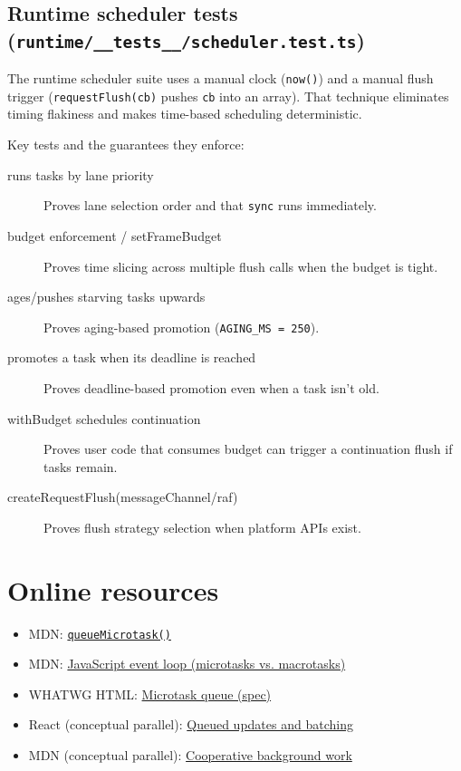 \subsection{Runtime scheduler tests (\texttt{runtime/\_\_tests\_\_/scheduler.test.ts})}

The runtime scheduler suite uses a manual clock (\texttt{now()}) and a manual flush trigger (\texttt{requestFlush(cb)} pushes \texttt{cb} into an array).
That technique eliminates timing flakiness and makes time-based scheduling deterministic.

Key tests and the guarantees they enforce:

\begin{description}
  \item[runs tasks by lane priority] Proves lane selection order and that \texttt{sync} runs immediately.
  \item[budget enforcement / setFrameBudget] Proves time slicing across multiple flush calls when the budget is tight.
  \item[ages/pushes starving tasks upwards] Proves aging-based promotion (\texttt{AGING\_MS = 250}).
  \item[promotes a task when its deadline is reached] Proves deadline-based promotion even when a task isn’t old.
  \item[withBudget schedules continuation] Proves user code that consumes budget can trigger a continuation flush if tasks remain.
  \item[createRequestFlush(messageChannel/raf)] Proves flush strategy selection when platform APIs exist.
\end{description}

\section{Online resources}

\begin{itemize}
  \item MDN: \href{https://developer.mozilla.org/en-US/docs/Web/API/queueMicrotask}{\texttt{queueMicrotask()}}
  \item MDN: \href{https://developer.mozilla.org/en-US/docs/Web/JavaScript/Event_loop}{JavaScript event loop (microtasks vs. macrotasks)}
  \item WHATWG HTML: \href{https://html.spec.whatwg.org/multipage/webappapis.html#microtask-queue}{Microtask queue (spec)}
  \item React (conceptual parallel): \href{https://react.dev/learn/queueing-a-series-of-state-updates}{Queued updates and batching}
  \item MDN (conceptual parallel): \href{https://developer.mozilla.org/en-US/docs/Web/API/Background_Tasks_API}{Cooperative background work}
\end{itemize}

